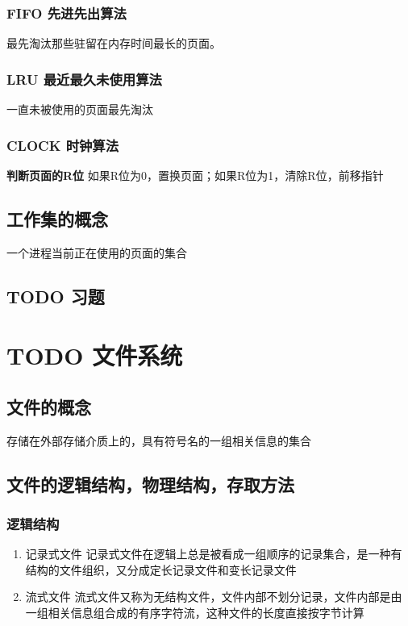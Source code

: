 \documentclass[11pt]{article}
\begin{document}
\subsubsection{FIFO 先进先出算法}
\label{sec-3-6-2}
最先淘汰那些驻留在内存时间最长的页面。
\subsubsection{LRU 最近最久未使用算法}
\label{sec-3-6-3}
一直未被使用的页面最先淘汰
\subsubsection{CLOCK 时钟算法}
\label{sec-3-6-4}
\textbf{判断页面的R位} 如果R位为0，置换页面；如果R位为1，清除R位，前移指针
\subsection{工作集的概念}
\label{sec-3-7}
一个进程当前正在使用的页面的集合
\subsection{{\bfseries\sffamily TODO} 习题}
\label{sec-3-8}

\section{{\bfseries\sffamily TODO} 文件系统}
\label{sec-4}
\subsection{文件的概念}
\label{sec-4-1}
存储在外部存储介质上的，具有符号名的一组相关信息的集合
\subsection{文件的逻辑结构，物理结构，存取方法}
\label{sec-4-2}
\subsubsection{逻辑结构}
\label{sec-4-2-1}
\begin{enumerate}
\item 记录式文件
\label{sec-4-2-1-1}
记录式文件在逻辑上总是被看成一组顺序的记录集合，是一种有结构的文件组织，又分成定长记录文件和变长记录文件
\item 流式文件
\label{sec-4-2-1-2}
流式文件又称为无结构文件，文件内部不划分记录，文件内部是由一组相关信息组合成的有序字符流，这种文件的长度直接按字节计算
\end{enumerate}
\end{document}
